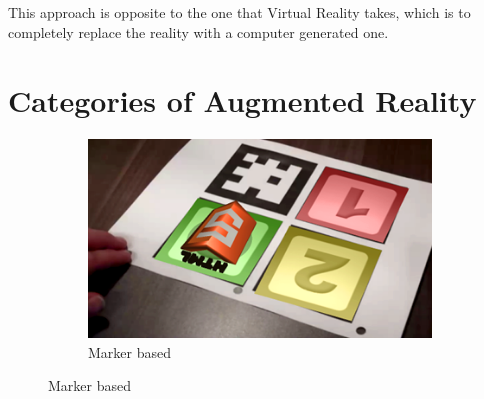 \documentclass[12 pct]{report}
\begin{document}
This approach is opposite to the one that Virtual Reality \cite{burdea2003virtual}  takes, which is to completely replace the reality with a computer generated one.

\section{Categories of Augmented Reality}
\begin{figure}[h!]
  \centering
  \begin{subfigure}[b]{0.36\linewidth}
    \includegraphics[width=\linewidth]{marker-based}
     \caption{Marker based \cite{wagner2003first}}
     

\end{subfigure}
\end{figure}
\end{document}
